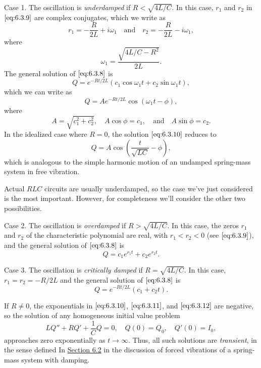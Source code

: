 \documentclass{ximera}
\begin{document}
Case 1.
The oscillation is \textit{underdamped} if $R<\sqrt{4L/C}$. In this
case, $r_1$ and $r_2$ in $\eqref{eq:6.3.9}$ are complex conjugates, which we
write as
$$
r_1=-\frac{R}{2L}+i\omega_1\quad\mbox{and}\quad r_2=-\frac{R}{2L}-i\omega_1,
$$
where
$$
\omega_1=\frac{\sqrt{4L/C-R^2}}{2L}.
$$
The general solution of  $\eqref{eq:6.3.8}$  is
$$
Q=e^{-Rt/2L}(c_1\cos\omega_1 t+c_2\sin\omega_1 t),
$$
which we can write as
\begin{equation}\label{eq:6.3.10}
Q=Ae^{-Rt/2L}\cos(\omega_1 t-\phi),
\end{equation}
 where
$$
A=\sqrt{c_1^2+c_2^2},\quad A\cos\phi=c_1,\quad\mbox{and}\quad A\sin\phi=c_2.
$$
In the idealized case where $R=0$, the solution $\eqref{eq:6.3.10}$
reduces to
$$
Q=A\cos\left(\frac{t}{\sqrt{LC}}-\phi\right),
$$
which is analogous to  the simple harmonic motion of an undamped
spring-mass system in free vibration.

Actual $RLC$ circuits are usually underdamped, so the case we've just
considered is the most important. However, for completeness we'll
consider the other two possibilities.

Case 2.
The oscillation is \textit{overdamped} if $R>\sqrt{4L/C}$. In this case,
the zeros $r_1$ and $r_2$ of the characteristic polynomial are real,
with $r_1<r_2<0$ (see $\eqref{eq:6.3.9}$), and the general solution of
$\eqref{eq:6.3.8}$ is
\begin{equation}\label{eq:6.3.11}
Q=c_1e^{r_1t}+c_2e^{r_2t}.
\end{equation}

Case 3.
The oscillation is \textit{critically damped} if $R=\sqrt{4L/C}$. In
this case, $r_1=r_2=-R/2L$ and the general solution of $\eqref{eq:6.3.8}$ is
\begin{equation}\label{eq:6.3.12}
Q=e^{-Rt/2L}(c_1+c_2t).
\end{equation}

If $R\neq 0$, the exponentials in $\eqref{eq:6.3.10}$, $\eqref{eq:6.3.11}$,
and
$\eqref{eq:6.3.12}$ are negative, so the solution of any homogeneous initial
value problem
$$
 LQ''+RQ'+\frac{1}{C}Q=0,\quad Q(0)=Q_0,\quad Q'(0)=I_0,
$$
approaches zero exponentially as $t\rightarrow\infty$. Thus, all such
solutions are \textit{transient}, in the sense defined
In \href{https://xerxes.ximera.org/differentialequations/main/springProblemsII/springProblemsII}{Section 6.2} in the discussion of forced vibrations of a
spring-mass system with damping.
\end{document}
